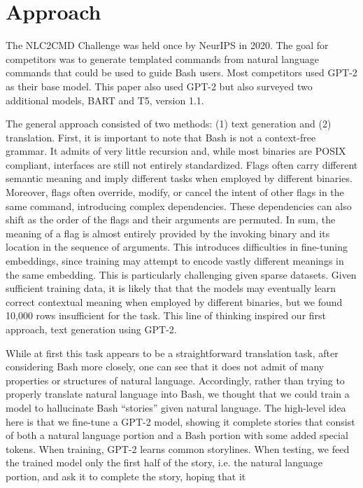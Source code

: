 \documentclass{article}
\begin{document}
\section{Approach}
The NLC2CMD Challenge was held once by NeurIPS in 2020. The goal for
competitors was to generate templated commands from natural language commands
that could be used to guide Bash users. Most competitors used GPT-2 as their
base model. This paper also used GPT-2 but also surveyed two additional models,
BART and T5, version 1.1.
\par
The general approach consisted of two methods: (1) text generation and (2)
translation. First, it is important to note that Bash is not a context-free
grammar. It admits of very little recursion and, while most binaries are POSIX
compliant, interfaces are still not entirely standardized. Flags often carry
different semantic meaning and imply
different tasks when employed by different binaries. Moreover, flags often
override, modify, or cancel the intent of other flags in the same command,
introducing complex dependencies. These dependencies can also shift as the
order of the flags and their arguments are permuted. In sum, the meaning of a
flag is almost entirely provided by the invoking binary and its location in the
sequence of arguments. This introduces difficulties in fine-tuning embeddings,
since training may attempt to encode
vastly different meanings in the same embedding. This is particularly
challenging given sparse datasets. Given sufficient training data, it is likely
that that the models may eventually learn correct contextual meaning when
employed by different binaries, but we found 10,000 rows insufficient for the
task. This line of thinking inspired our first approach, text generation using
GPT-2.
\par
While at first this task appears to be a straightforward translation task,
after considering Bash more closely, one can see that it does not admit of many
properties or structures of natural language. Accordingly, rather than trying
to properly translate natural language into Bash, we thought that we could
train a model to hallucinate Bash ``stories'' given natural language. The
high-level idea here is that we fine-tune a GPT-2 model, showing it complete
stories that consist of both a natural language portion and a Bash portion with
some added special tokens. When training, GPT-2 learns common storylines.
When testing, we feed the trained model only the first half of the story, i.e.
the natural language portion, and ask it to complete the story, hoping that it
\end{document}
